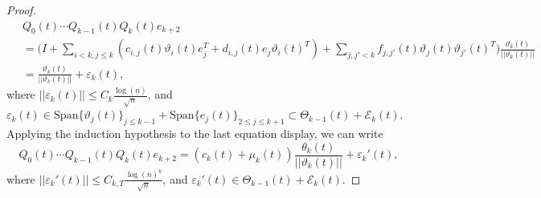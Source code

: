 \documentclass[10pt,a4paper]{amsart}
\begin{document}
\begin{proof}
\begin{equation*}
    \begin{split}
        ~&Q_0(t)\cdots Q_{k-1}(t)Q_k(t)e_{k+2}\\
        &= \bigg(I+\sum_{i <k, j \leq k} (c_{i,j}(t) \vartheta_i(t)e_j^T+d_{i,j}(t) e_j\vartheta_i(t)^T)+\sum_{j,j' < k } f_{j,j'}(t) \vartheta_j(t)\vartheta_{j'}(t)^T\bigg) \frac{\vartheta_k(t)}{||\vartheta_k(t)||}\\
            & = \frac{\vartheta_k(t)}{||\vartheta_k(t)||}+\varepsilon_k(t),
    \end{split}
\end{equation*}
where $||\varepsilon_k(t)||\leq C_k\frac{\log(n)}{\sqrt{n}}$, and $\varepsilon_k(t) \in \mathrm{Span}\{\vartheta_j(t)\}_{j\leq k-1}+\mathrm{Span}\{e_j(t)\}_{2\leq j\leq k+1} \subset \Theta_{k-1}(t)+\mathcal{E}_{k}(t)$. Applying the induction hypothesis to the last equation display, we can write
\begin{equation*}
    Q_0(t)\cdots Q_{k-1}(t)Q_k(t)e_{k+2}  =\left(c_k(t)+\mu_k(t)\right)\frac{\theta_k(t)}{||\vartheta_{k}(t)||}+\varepsilon_k'(t),
\end{equation*}
where $||\varepsilon_k'(t)||\leq C_{k,T}\frac{\log(n)^k}{\sqrt{n}}$, and $\varepsilon_k'(t) \in \Theta_{k-1}(t)+\mathcal{E}_{k}(t)$. 


\end{proof}
\end{document}
